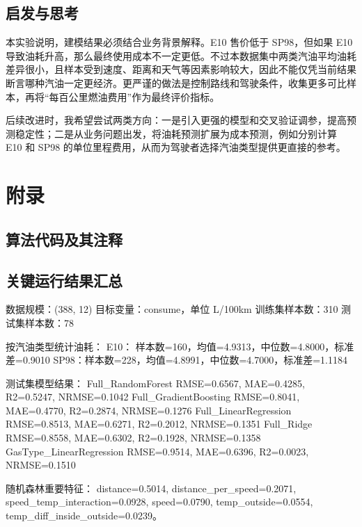 \documentclass[UTF8,a4paper,12pt]{ctexart}
\begin{document}
\subsection{启发与思考}

本实验说明，建模结果必须结合业务背景解释。E10 售价低于 SP98，但如果 E10 导致油耗升高，那么最终使用成本不一定更低。不过本数据集中两类汽油平均油耗差异很小，且样本受到速度、距离和天气等因素影响较大，因此不能仅凭当前结果断言哪种汽油一定更经济。更严谨的做法是控制路线和驾驶条件，收集更多可比样本，再将“每百公里燃油费用”作为最终评价指标。

后续改进时，我希望尝试两类方向：一是引入更强的模型和交叉验证调参，提高预测稳定性；二是从业务问题出发，将油耗预测扩展为成本预测，例如分别计算 E10 和 SP98 的单位里程费用，从而为驾驶者选择汽油类型提供更直接的参考。

\section{附录}

\subsection*{算法代码及其注释}


\subsection*{关键运行结果汇总}

\begin{CodeBlock}
数据规模：(388, 12)
目标变量：consume，单位 L/100km
训练集样本数：310
测试集样本数：78

按汽油类型统计油耗：
E10： 样本数=160，均值=4.9313，中位数=4.8000，标准差=0.9010
SP98：样本数=228，均值=4.8991，中位数=4.7000，标准差=1.1184

测试集模型结果：
Full_RandomForest        RMSE=0.6567, MAE=0.4285, R2=0.5247, NRMSE=0.1042
Full_GradientBoosting    RMSE=0.8041, MAE=0.4770, R2=0.2874, NRMSE=0.1276
Full_LinearRegression    RMSE=0.8513, MAE=0.6271, R2=0.2012, NRMSE=0.1351
Full_Ridge               RMSE=0.8558, MAE=0.6302, R2=0.1928, NRMSE=0.1358
GasType_LinearRegression RMSE=0.9514, MAE=0.6396, R2=0.0023, NRMSE=0.1510

随机森林重要特征：
distance=0.5014, distance_per_speed=0.2071, speed_temp_interaction=0.0928,
speed=0.0790, temp_outside=0.0554, temp_diff_inside_outside=0.0239。
\end{CodeBlock}
\end{document}
